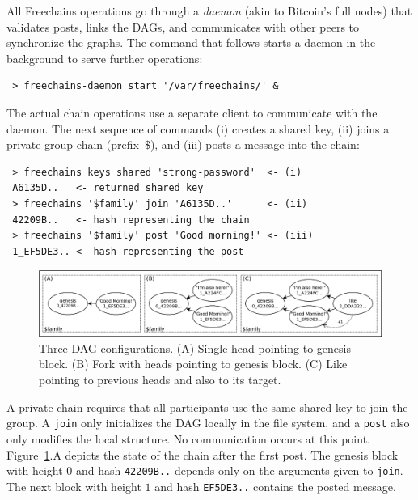 \documentclass[10pt,journal,compsoc]{IEEEtran}
\newcommand{\FC}       {Freechains\xspace}
\newcommand{\code}[1]  {\texttt{\footnotesize{#1}}}
\begin{document}
All \FC operations go through a \emph{daemon} (akin to Bitcoin's full nodes)
that validates posts, links the DAGs, and communicates with other peers to
synchronize the graphs.
The command that follows starts a daemon in the background to serve further
operations:

{\footnotesize
\begin{verbatim}
 > freechains-daemon start '/var/freechains/' &
\end{verbatim}
}

The actual chain operations use a separate client to communicate with the
daemon.
The next sequence of commands (i) creates a shared key, (ii) joins a private
group chain (prefix~$\$$), and (iii) posts a message into the chain:

{\footnotesize
\begin{verbatim}
 > freechains keys shared 'strong-password'  <- (i)
 A6135D..   <- returned shared key
 > freechains '$family' join 'A6135D..'      <- (ii)
 42209B..   <- hash representing the chain
 > freechains '$family' post 'Good morning!' <- (iii)
 1_EF5DE3.. <- hash representing the post
\end{verbatim}
}

\begin{figure}
\centering
\includegraphics[width=\textwidth]{family.png}
\caption{
    Three DAG configurations.
    (A) Single head pointing to genesis block.
    (B) Fork with heads pointing to genesis block.
    (C) Like pointing to previous heads and also to its target.
}
\label{fig.family}
\end{figure}

A private chain requires that all participants use the same shared key to join
the group.
A \code{join} only initializes the DAG locally in the file system, and a
\code{post} also only modifies the local structure.
No communication occurs at this point.
Figure~\ref{fig.family}.A depicts the state of the chain after the first post.
The genesis block with height $0$ and hash \code{42209B..}
depends only on the arguments given to \code{join}.
The next block with height $1$ and hash \code{EF5DE3..} contains the posted
message.
\end{document}
